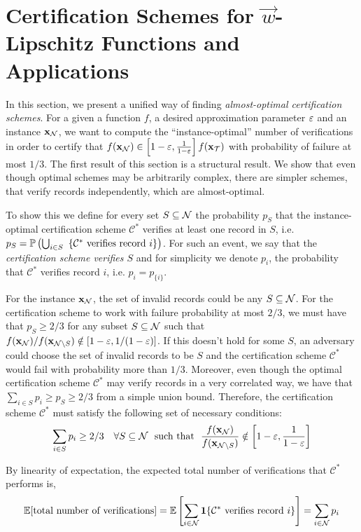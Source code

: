 \section{Certification Schemes for $\vec{w}$-Lipschitz Functions and Applications} \label{sec:instOpt}

    In this section, we present a unified way of finding \textit{almost-optimal certification schemes}. For a given
a function $f$, a desired approximation parameter $\varepsilon$ and an instance $\mathbf{x}_{\mathcal{N}}$, we want to compute the
``instance-optimal'' number of verifications in order to certify that
$f(\mathbf{x}_{\mathcal{N}}) \in \left[ 1 - \varepsilon, \frac{1}{1 - \varepsilon} \right] f(\mathbf{x}_{\mathcal{T}})$ with probability of failure at most $1/3$.
The first result of this section is a structural result. We show that even though optimal schemes may be arbitrarily
complex, there are simpler schemes, that verify records independently, which are almost-optimal.
\smallskip

To show this we define for every set $S\subseteq \mathcal{N}$ the probability $p_S$ that the instance-optimal certification scheme
$\mathcal{C}^*$ verifies at least one record in $S$, i.e. $p_S = \mathbb{P}\left(\bigcup_{i \in S} \text{ \{$\mathcal{C}^*$ verifies
record $i$\}} \right)$. For such an event, we say that the \emph{certification scheme verifies $S$} and for simplicity we denote
$p_i$, the probability that $\mathcal{C}^*$ verifies record $i$, i.e. $p_i = p_{\{i\}}$.

    For the instance $\mathbf{x}_{\mathcal{N}}$, the set of invalid records could be any $S \subseteq \mathcal{N}$. For the certification
scheme to work with failure probability at most $2/3$, we must have that $p_{S} \ge 2/3$ for any subset $S \subseteq \mathcal{N}$
such that $f(\mathbf{x}_{\mathcal{N}})/f(\mathbf{x}_{\mathcal{N}\setminus S}) \notin [1 - \varepsilon, 1/(1 - \varepsilon)]$. If this doesn't hold for some $S$, an
adversary could choose the set of invalid records to be $S$ and the certification scheme $\mathcal{C}^*$ would fail with
probability more than $1/3$. Moreover, even though the  optimal certification scheme $\mathcal{C}^*$ may verify records in a very
correlated way, we have that  $\sum_{i \in  S} p_i \ge p_{ S} \ge 2/3$ from a simple union bound. Therefore, the certification
scheme $\mathcal{C}^*$ must satisfy the following set of necessary conditions:
  \[ \sum_{i \in  S} p_i \ge 2/3 ~~~\forall S \subseteq \mathcal{N} \text{~ such that ~} \frac{f(\mathbf{x}_{\mathcal{N}})}{f(\mathbf{x}_{\mathcal{N}\setminus S})} \notin \left[ 1 - \varepsilon, \frac{1}{1 - \varepsilon} \right] \]

  \noindent By linearity of expectation, the expected total number of verifications that $\mathcal{C}^*$ performs is,
  \[ \mathbb{E}[ \text{total number of verifications} ] = \mathbb{E} \left[ \sum_{i \in \mathcal{N}} \mathbf{1}\text{\{$\mathcal{C}^*$ verifies record $i$\}} \right] = \sum_{i \in \mathcal{N}} p_i \] %

